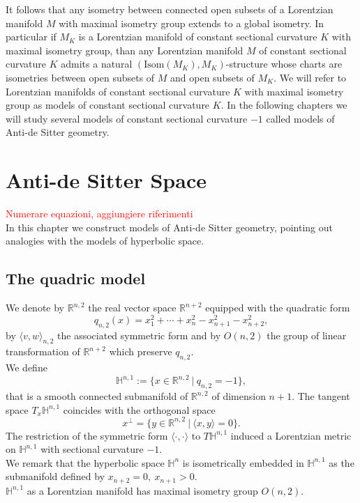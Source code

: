 \documentclass[10pt,a4paper,oneside,reqno]{book}
\def\R{\mathbb{R}}
\def\H{\mathbb{H}}
\newcommand\red[1]{\textcolor{red}{#1}}
\theoremstyle{plain}
\theoremstyle{definition}
\theoremstyle{plain}
\theoremstyle{plain}
\theoremstyle{mystyleNormalFont}
\begin{document}
It follows that any isometry between connected open subsets of a Lorentzian manifold $M$ with
maximal isometry group extends to a global isometry. In particular if $M_K$ is a Lorentzian
manifold of constant sectional curvature $K$ with maximal isometry group, than any Lorentzian
manifold $M$ of constant sectional curvature $K$ admits a natural $(\text{Isom}(M_K),M_K)$-structure
whose charts are isometries between open subsets of $M$ and open subsets of $M_K$.
We will refer to Lorentzian manifolds of constant sectional curvature $K$ with maximal isometry group as models of constant sectional curvature $K$. In the following chapters we will study several models of constant sectional curvature $-1$ called models of Anti-de Sitter geometry.

\chapter{Anti-de Sitter Space} \label{chapter:2}

\red{Numerare equazioni, aggiungiere riferimenti}\\
In this chapter we construct models of Anti-de Sitter geometry, pointing out analogies with the models of hyperbolic space.

\section{The quadric model}
We denote by $\R ^{n,2}$ the real vector space $\R ^{n+2}$ equipped with the quadratic form
\[
q_{n,2}(x) = x_1^2 + \cdots + x_n^2 - x_{n+1}^2 - x_{n+2}^2,
\]
by $\langle v,w \rangle_{n,2}$ the associated symmetric form and by $O(n,2)$ the group of linear transformation of $\R^{n+2}$ which preserve $q_{n,2}$.\\
We define
\[
\H^{n,1} := \{ x\in \R^{n,2} \ | \ q_{n,2} = -1 \},
\]
that is a smooth connected submanifold of $\R^{n,2}$ of dimension $n+1$. The tangent space $T_x \H^{n,1}$ coincides with the orthogonal space
\[
x^\perp = \{ y\in\R^{n,2} \ | \ \langle x,y \rangle=0 \}.
\]
The restriction of the symmetric form $\langle \cdot , \cdot \rangle$ to $T\H^{n,1}$ induced a Lorentzian metric on $\H^{n,1}$ with sectional curvature $-1$.\\
We remark that the hyperbolic space $\H^n$ is isometrically embedded in $\H^{n,1}$ as the submanifold defined by $x_{n+2}=0,\ x_{n+1}>0$.\\
$\H^{n,1}$ as a Lorentzian manifold has maximal isometry group $O(n,2)$.
\end{document}
